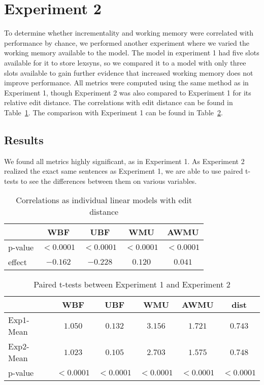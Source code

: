 \section{Experiment 2}
To determine whether incrementality and working memory were correlated with performance by chance, we performed another experiment where we varied the working memory available to the model. The model in experiment 1 had five slots available for it to store lexsyns, so we compared it to a model with only three slots available to gain further evidence that increased working memory does not improve performance. All metrics were computed using the same method as in Experiment 1, though Experiment 2 was also compared to Experiment 1 for its relative edit distance. The correlations with edit distance can be found in Table~\ref{exp2}. The comparison with Experiment 1 can be found in Table~\ref{compare}.

\subsection{Results}
We found all metrics highly significant, as in Experiment 1. As Experiment 2 realized the exact same sentences as Experiment 1, we are able to use paired t-tests to see the differences between them on various variables. 

\begin{table}
	\centering
	\begin{tabular}{l|cccc}
		& WBF & UBF & WMU & AWMU \\ \hline
		p-value & $<0.0001$ & $<0.0001$ & $<0.0001$ & $<0.0001$ \\
		effect & $-0.162$ & $-0.228 $ & $0.120$ & $0.041$ \\
	\end{tabular}
	\label{exp2}
	\caption{Correlations as individual linear models with edit distance}
\end{table}

\begin{table}
	\centering
	\begin{tabular}{l|ccccc}
		           & WBF & UBF & WMU & AWMU & dist \\ \hline
		Exp1-Mean & $1.050$ & $0.132$ & $3.156$ & $1.721$ & $0.743$ \\
		Exp2-Mean & $1.023$ & $0.105$ & $2.703$ & $1.575$ & $0.748$ \\
		p-value   & $<0.0001$  & $<0.0001$ & $<0.0001$ & $<0.0001$ & $<0.0001$ \\
	\end{tabular}
	\label{compare}
	\caption{Paired t-tests between Experiment 1 and Experiment 2}
\end{table}

